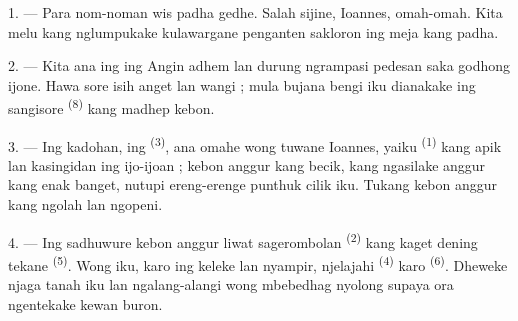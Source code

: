 %
%

\VUsaut{4.0mm}
\VUsaut{1.6mm}
\VUsaut{3.2mm}

\VUsaut{1.6mm}
\VUsaut{2.6mm}

\VUsaut{3.0mm}

1. --- Para nom-noman wis padha gedhe. Salah sijine, Ioannes, omah-omah.
Kita melu  kang nglumpukake kulawargane penganten
sakloron ing meja kang padha.

2. --- Kita ana ing  ing 
Angin adhem  lan  durung ngrampasi
pedesan saka godhong ijone. Hawa sore isih anget lan wangi ; mula
bujana bengi iku dianakake ing sangisore 
\textsuperscript{(8)} kang madhep kebon.

3. --- Ing kadohan, ing  \textsuperscript{(3)}, ana omahe
wong tuwane Ioannes, yaiku  \textsuperscript{(1)} kang apik
lan kasingidan ing ijo-ijoan ; kebon anggur kang becik, kang ngasilake
anggur kang enak banget, nutupi ereng-erenge punthuk cilik iku. Tukang
kebon anggur kang ngolah lan ngopeni.

4. --- Ing sadhuwure kebon anggur liwat sagerombolan 
\textsuperscript{(2)} kang kaget dening tekane 
\textsuperscript{(5)}. Wong iku, karo  ing keleke lan
 nyampir, njelajahi 
\textsuperscript{(4)} karo  \textsuperscript{(6)}. Dheweke
njaga tanah iku lan ngalang-alangi wong mbebedhag nyolong supaya ora
ngentekake kewan buron.

